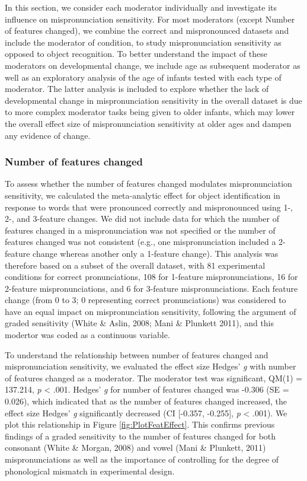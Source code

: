 \documentclass[man]{apa6}
\theoremstyle{definition}
\theoremstyle{definition}
\theoremstyle{definition}
\theoremstyle{remark}
\begin{document}
In this section, we consider each moderator individually and investigate
its influence on mispronunciation sensitivity. For most moderators
(except Number of features changed), we combine the correct and
mispronounced datasets and include the moderator of condition, to study
mispronunciation sensitivity as opposed to object recognition. To better
understand the impact of these moderators on developmental change, we
include age as subsequent moderator as well as an exploratory analysis
of the age of infants tested with each type of moderator. The latter
analysis is included to explore whether the lack of developmental change
in mispronunciation sensitivity in the overall dataset is due to more
complex moderator tasks being given to older infants, which may lower
the overall effect size of mispronunciation sensitivity at older ages
and dampen any evidence of change.

\subsubsection{Number of features
changed}\label{number-of-features-changed}

To assess whether the number of features changed modulates
mispronunciation sensitivity, we calculated the meta-analytic effect for
object identification in response to words that were pronounced
correctly and mispronounced using 1-, 2-, and 3-feature changes. We did
not include data for which the number of features changed in a
mispronunciation was not specified or the number of features changed was
not consistent (e.g., one mispronunciation included a 2-feature change
whereas another only a 1-feature change). This analysis was therefore
based on a subset of the overall dataset, with 81 experimental
conditions for correct pronunciations, 108 for 1-feature
mispronunciations, 16 for 2-feature mispronunciations, and 6 for
3-feature mispronunciations. Each feature change (from 0 to 3; 0
representing correct pronunciations) was considered to have an equal
impact on mispronunciation sensitivity, following the argument of graded
sensitivity (White \& Aslin, 2008; Mani \& Plunkett 2011), and this
modertor was coded as a continuous variable.

To understand the relationship between number of features changed and
mispronunciation sensitivity, we evaluated the effect size Hedges'
\emph{g} with number of features changed as a moderator. The moderator
test was significant, QM(1) = 137.214, \emph{p} \textless{} .001.
Hedges' \emph{g} for number of features changed was -0.306 (SE = 0.026),
which indicated that as the number of features changed increased, the
effect size Hedges' \emph{g} significantly decreased (CI {[}-0.357,
-0.255{]}, \emph{p} \textless{} .001). We plot this relationship in
Figure \ref{fig:PlotFeatEffect}. This confirms previous findings of a
graded sensitivity to the number of features changed for both consonant
(White \& Morgan, 2008) and vowel (Mani \& Plunkett, 2011)
mispronunciations as well as the importance of controlling for the
degree of phonological mismatch in experimental design.
\end{document}

